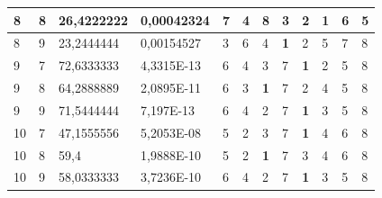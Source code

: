 \documentclass[conference]{IEEEtran}
\begin{document}
\begin{table}[]
\begin{tabular}{|llll|llllllll|}
		\multicolumn{1}{|l|}{8} & \multicolumn{1}{l|}{8} & \multicolumn{1}{l|}{26,4222222} & 0,00042324 & \multicolumn{1}{l|}{7} & \multicolumn{1}{l|}{4} & \multicolumn{1}{l|}{8} & \multicolumn{1}{l|}{3} & \multicolumn{1}{l|}{2} & \multicolumn{1}{l|}{\textbf{1}} & \multicolumn{1}{l|}{6} & 5 \\ \hline
		\multicolumn{1}{|l|}{8} & \multicolumn{1}{l|}{9} & \multicolumn{1}{l|}{23,2444444} & 0,00154527 & \multicolumn{1}{l|}{3} & \multicolumn{1}{l|}{6} & \multicolumn{1}{l|}{4} & \multicolumn{1}{l|}{\textbf{1}} & \multicolumn{1}{l|}{2} & \multicolumn{1}{l|}{5} & \multicolumn{1}{l|}{7} & 8 \\ \hline
		\multicolumn{1}{|l|}{9} & \multicolumn{1}{l|}{7} & \multicolumn{1}{l|}{72,6333333} & 4,3315E-13 & \multicolumn{1}{l|}{6} & \multicolumn{1}{l|}{4} & \multicolumn{1}{l|}{3} & \multicolumn{1}{l|}{7} & \multicolumn{1}{l|}{\textbf{1}} & \multicolumn{1}{l|}{2} & \multicolumn{1}{l|}{5} & 8 \\ \hline
		\multicolumn{1}{|l|}{9} & \multicolumn{1}{l|}{8} & \multicolumn{1}{l|}{64,2888889} & 2,0895E-11 & \multicolumn{1}{l|}{6} & \multicolumn{1}{l|}{3} & \multicolumn{1}{l|}{\textbf{1}} & \multicolumn{1}{l|}{7} & \multicolumn{1}{l|}{2} & \multicolumn{1}{l|}{4} & \multicolumn{1}{l|}{5} & 8 \\ \hline
		\multicolumn{1}{|l|}{9} & \multicolumn{1}{l|}{9} & \multicolumn{1}{l|}{71,5444444} & 7,197E-13 & \multicolumn{1}{l|}{6} & \multicolumn{1}{l|}{4} & \multicolumn{1}{l|}{2} & \multicolumn{1}{l|}{7} & \multicolumn{1}{l|}{\textbf{1}} & \multicolumn{1}{l|}{3} & \multicolumn{1}{l|}{5} & 8 \\ \hline
		\multicolumn{1}{|l|}{10} & \multicolumn{1}{l|}{7} & \multicolumn{1}{l|}{47,1555556} & 5,2053E-08 & \multicolumn{1}{l|}{5} & \multicolumn{1}{l|}{2} & \multicolumn{1}{l|}{3} & \multicolumn{1}{l|}{7} & \multicolumn{1}{l|}{\textbf{1}} & \multicolumn{1}{l|}{4} & \multicolumn{1}{l|}{6} & 8 \\ \hline
		\multicolumn{1}{|l|}{10} & \multicolumn{1}{l|}{8} & \multicolumn{1}{l|}{59,4} & 1,9888E-10 & \multicolumn{1}{l|}{5} & \multicolumn{1}{l|}{2} & \multicolumn{1}{l|}{\textbf{1}} & \multicolumn{1}{l|}{7} & \multicolumn{1}{l|}{3} & \multicolumn{1}{l|}{4} & \multicolumn{1}{l|}{6} & 8 \\ \hline
		\multicolumn{1}{|l|}{10} & \multicolumn{1}{l|}{9} & \multicolumn{1}{l|}{58,0333333} & 3,7236E-10 & \multicolumn{1}{l|}{6} & \multicolumn{1}{l|}{4} & \multicolumn{1}{l|}{2} & \multicolumn{1}{l|}{7} & \multicolumn{1}{l|}{\textbf{1}} & \multicolumn{1}{l|}{3} & \multicolumn{1}{l|}{5} & 8 \\ \hline

\end{tabular}
\end{table}
\end{document}
